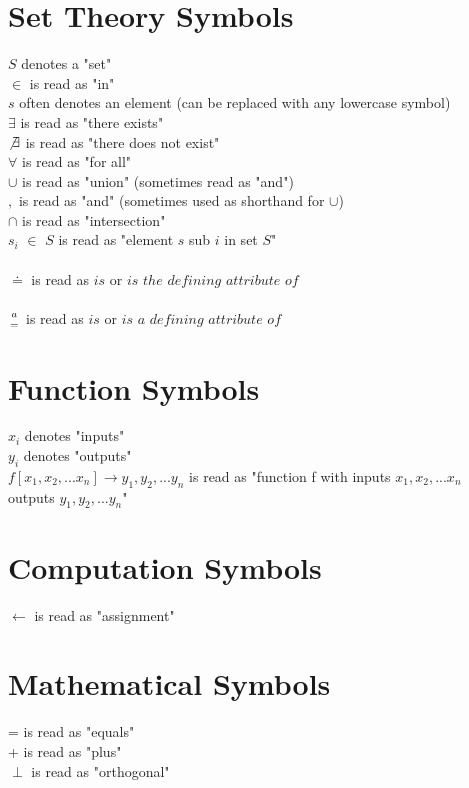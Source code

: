 \documentclass[11pt]{article}
\begin{document}
\section*{Set Theory Symbols}
$S$ denotes a "set"\\
$\in$ is read as "in"\\
$s$ often denotes an element (can be replaced with any lowercase symbol)\\
$\exists$ is read as "there exists"\\
$\not \exists$ is read as "there does not exist"\\
$\forall$ is read as "for all"\\
$\cup$ is read as "union" (sometimes read as "and")\\
$,$ \hspace{.5mm} is read as "and" (sometimes used as shorthand for $\cup$)\\
$\cap$ is read as "intersection"\\
$s_i$ $\in$ $S$ is read as "element $s$ sub $i$ in set $S$"\\ \\
$\doteq$ is read as $is$ or $is$ $the$ $defining$ $attribute$ $of$\\ \\
$a \atop=$ is read as $is$ or $is$ $a$ $defining$ $attribute$ $of$\\







\section*{Function Symbols}
$x_i$ denotes "inputs"\\
$y_i$ denotes "outputs"\\
$f[x_1,x_2,...x_n] \rightarrow y_1, y_2,...y_n$ \hspace{1.5mm} is read as "function f with inputs $x_1,x_2,...x_n$ outputs $y_1,y_2,...y_n$"\\








\section*{Computation Symbols}
$\leftarrow$ is read as "assignment"\\








\section*{Mathematical Symbols}
= is read as "equals"\\
+ is read as "plus"\\
$\perp$ is read as "orthogonal"\\
\end{document}
